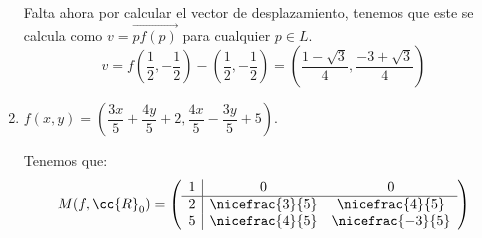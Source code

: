 \begin{ejercicio}
\begin{enumerate}
        Falta ahora por calcular el vector de desplazamiento, tenemos que este se calcula como $v=\vec{pf(p)}$ para cualquier $p\in L$.
        \begin{equation*}
            v = f\left(\frac{1}{2}, -\frac{1}{2}\right)-\left(\frac{1}{2}, -\frac{1}{2}\right)
            = \left(\frac{1-\sqrt{3}}{4},\frac{-3+\sqrt{3}}{4}\right)
        \end{equation*}
        

        
        \item $f\left(x, y\right) = \left(\dfrac{3x}{5} + \dfrac{4y}{5} + 2, \dfrac{4x}{5} - \dfrac{3y}{5} + 5\right).$

        Tenemos que:
        \begin{equation*}
            M(f,\cc{R}_0) = \left(
            \begin{array}{c|cc}
                1 & 0 & 0 \\ \hline
                2 & \nicefrac{3}{5} & \nicefrac{4}{5} \\
                5 & \nicefrac{4}{5} & \nicefrac{-3}{5} \\
            \end{array}
            \right)
        \end{equation*}


\end{enumerate}
\end{ejercicio}
